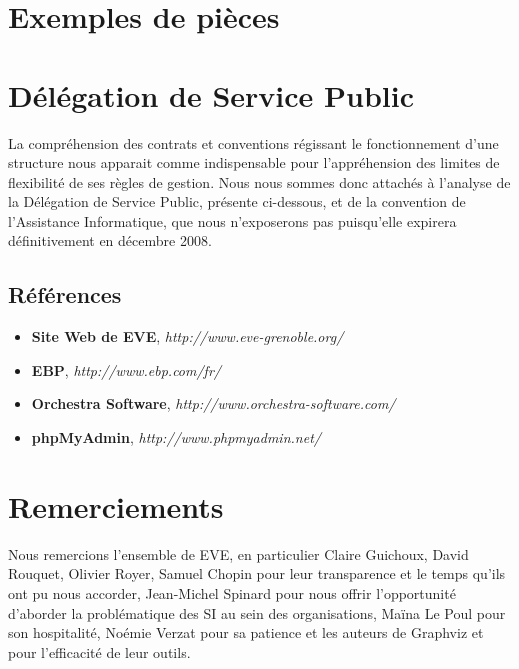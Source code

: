 \section{Exemples de pièces}


\section{Délégation de Service Public}

La compréhension des contrats et conventions régissant le fonctionnement d'une
structure nous apparait comme indispensable pour l'appréhension des limites de
flexibilité de ses règles de gestion. Nous nous sommes donc attachés à l'analyse
de la Délégation de Service Public, présente ci-dessous, et de la convention
de l'Assistance Informatique, que nous n'exposerons pas puisqu'elle expirera 
définitivement en décembre 2008.

\newpage

\begin{center}
	
\end{center}

\newpage

\subsection{Références}

\begin{itemize}
\item \textbf{Site Web de EVE}, \textit{http://www.eve-grenoble.org/}
\item \textbf{EBP}, \textit{http://www.ebp.com/fr/}
\item \textbf{Orchestra Software}, \textit{http://www.orchestra-software.com/}
\item \textbf{phpMyAdmin}, \textit{http://www.phpmyadmin.net/}
\end{itemize}

\section*{Remerciements}

Nous remercions l'ensemble de EVE, en particulier Claire Guichoux, David Rouquet,
Olivier Royer, Samuel Chopin pour leur transparence et le temps qu'ils ont pu
nous accorder, Jean-Michel Spinard pour nous offrir l'opportunité d'aborder
la problématique des SI au sein des organisations,
Maïna Le Poul pour son hospitalité, Noémie Verzat pour sa patience et
les auteurs de Graphviz et \LaTeXe pour l'efficacité de leur outils.
